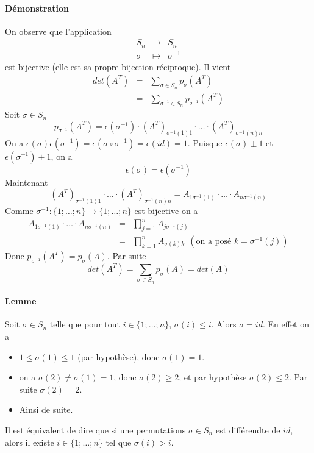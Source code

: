 \paragraph{Démonstration} On observe que l'application
\begin{eqnarray*}
  S_n &\rightarrow& S_n \\
  \sigma &\mapsto& \sigma^{-1}
\end{eqnarray*}
est bijective (elle est sa propre bijection réciproque). Il vient
\begin{eqnarray*}
  det(A^{T}) &=& \sum_{\sigma \in S_n} p_{\sigma}(A^{T}) \\
    &=& \sum_{\sigma^{-1} \in S_n} p_{\sigma^{-1}}(A^{T})
\end{eqnarray*}
Soit $\sigma \in S_n$
$$p_{\sigma^{-1}}(A^{T}) = \epsilon(\sigma^{-1}) \cdot (A^{T})_{\sigma^{-1}(1) 1} \cdot \ldots \cdot (A^{T})_{\sigma^{-1}(n) n}$$
On a $\epsilon(\sigma) \epsilon(\sigma^{-1}) = \epsilon(\sigma \circ \sigma^{-1}) = \epsilon(id) = 1$. Puisque $\epsilon(\sigma) \pm 1$ et $\epsilon(\sigma^{-1}) \pm 1$, on a 
$$\epsilon(\sigma) = \epsilon(\sigma^{-1})$$
Maintenant
$$(A^{T})_{\sigma^{-1}(1) 1} \cdot \ldots \cdot (A^{T})_{\sigma^{-1}(n) n} = A_{1 \sigma^{-1}(1)} \cdot \ldots \cdot A_{n \sigma^{-1}(n)}$$
Comme $\sigma^{-1}: \{1; \ldots; n\} \rightarrow \{1; \ldots; n\}$ est bijective on a
\begin{eqnarray*}
  A_{1 \sigma^{-1}(1)} \cdot \ldots \cdot A_{n \sigma^{-1}(n)} &=& \prod_{j=1}^n A_{j \sigma^{-1}(j)} \\
    &=& \prod_{k=1}^n A_{\sigma(k) k} ~~ (\text{on a posé } k = \sigma^{-1}(j))
\end{eqnarray*}
Donc $p_{\sigma^{-1}}(A^{T}) = p_{\sigma}(A)$. Par suite
$$det(A^{T}) = \sum_{\sigma \in S_n} p_{\sigma}(A) = det(A)$$

\paragraph{Lemme} Soit $\sigma \in S_n$ telle que pour tout $i \in \{1; \ldots; n\}$, $\sigma(i) \leq i$. Alors $\sigma  = id$. En effet on a
\begin{itemize}
  \item $1 \leq \sigma(1) \leq 1$ (par hypothèse), donc $\sigma(1) = 1$.
  \item on a $\sigma(2) \neq \sigma(1) = 1$, donc $\sigma(2) \geq 2$, et par hypothèse $\sigma(2) \leq 2$. Par suite $\sigma(2) = 2$.
  \item Ainsi de suite.
\end{itemize}
Il est équivalent de dire que si une permutations $\sigma \in S_n$ est différendte de $id$, alors il existe $i \in \{1; \ldots; n\}$ tel que $\sigma(i) > i$.

